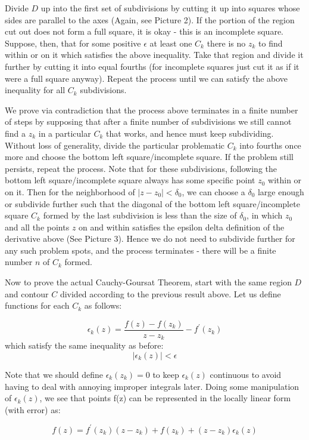 \documentclass[11pt]{article}
\begin{document}
Divide $D$ up into the first set of subdivisions by cutting it up into squares whose sides are parallel to the axes (Again, see Picture 2). If the portion of the region cut out does not form a full square, it is okay - this is an incomplete square. Suppose, then, that for some positive $\epsilon$ at least one $C_k$ there is no $z_k$ to find within or on it which satisfies the above inequality. Take that region and divide it further by cutting it into equal fourths (for incomplete squares just cut it as if it were a full square anyway). Repeat the process until we can satisfy the above inequality for all $C_k$ subdivisions.

We prove via contradiction that the process above terminates in a finite number of steps by supposing that after a finite number of subdivisions we still cannot find a $z_k$ in a particular $C_k$ that works, and hence must keep subdividing. Without loss of generality, divide the particular problematic $C_k$ into fourths once more and choose the bottom left square/incomplete square. If the problem still persists, repeat the process. Note that for these subdivisions, following the bottom left square/incomplete square always has some specific point $z_0$ within or on it. Then for the neighborhood of $|z-z_0|<\delta_0$, we can choose a $\delta_0$ large enough or subdivide further such that the diagonal of the bottom left square/incomplete square $C_k$ formed by the last subdivision is less than the size of $\delta_0$, in which $z_0$ and all the points $z$ on and within satisfies the epsilon delta definition of the derivative above (See Picture 3). Hence we do not need to subdivide further for any such problem spots, and the process terminates - there will be a finite number $n$ of $C_k$ formed.

Now to prove the actual Cauchy-Goursat Theorem, start with the same region $D$ and contour $C$ divided according to the previous result above. Let us define functions for each $C_k$ as follows:

$$\epsilon_k(z) = \frac{f(z) - f(z_k)}{z-z_k} - f^{\prime}(z_k)$$ which satisfy the same inequality as before: $$|\epsilon_k(z)|<\epsilon$$

Note that we should define $\epsilon_k(z_k) = 0$ to keep $\epsilon_k(z)$ continuous to avoid having to deal with annoying improper integrals later. Doing some manipulation of $\epsilon_k(z)$, we see that points f(z) can be represented in the locally linear form (with error) as:

$$f(z) = f^{\prime}(z_k) (z-z_k) + f(z_k) + (z-z_k)\epsilon_k(z)$$
\end{document}

